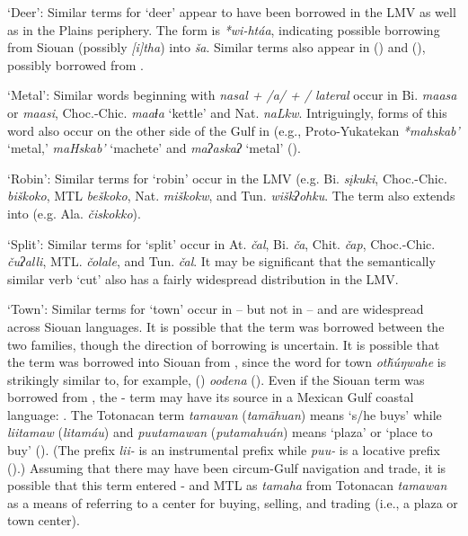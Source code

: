 \documentclass[output=paper]{LSP/langsci}
\begin{document}
\ea  \parbox[t]{.9\textwidth}{`Deer': Similar terms for `deer' appear to have been borrowed in the LMV as well as in the Plains periphery. The  form is \emph{*wi-htáa}, indicating possible borrowing from Siouan (possibly  \emph{[i]tha}) into  \emph{ša}. Similar terms also appear in  () and  (), possibly borrowed from . }
\z

\ea \parbox[t]{.9\textwidth} {`Metal': Similar words beginning with \emph{nasal + /a/ +  / lateral} occur in Bi. \emph{maasa} or \emph{maasi}, Choc.-Chic. \emph{maaɬa} `kettle' and Nat. \emph{naLkw}. Intriguingly, forms of this word also occur on the other side of the Gulf in  (e.g., Proto-Yukatekan \emph{*mahskab’} `metal,'  \emph{maHskab’} `machete' and  \emph{maʔaskaʔ} `metal' (\citealt[208]{KaufmanJusteson2003}).}
\z

\ea  \parbox[t]{.9\textwidth}{`Robin': Similar terms for `robin' occur in the LMV (e.g. Bi. \emph{sįkuki}, Choc.-Chic. \emph{biškoko}, MTL \emph{beškoko}, Nat. \emph{miškokw}, and Tun. \emph{wiškʔohku}. The term also extends into  (e.g. Ala. \emph{čiskokko}).}
\z

\ea \parbox[t]{.9\textwidth} {`Split': Similar terms for `split' occur in At. \emph{čal}, Bi. \emph{ča}, Chit. \emph{čap}, Choc.-Chic. \emph{čuʔalli}, MTL. \emph{čolale}, and Tun. \emph{čal}. It may be significant that the semantically similar verb `cut' also has a fairly widespread distribution in the LMV.}
\z

\ea  \parbox[t]{.9\textwidth}{`Town': Similar terms for `town' occur in  -- but not in  -- and are widespread across Siouan languages. It is possible that the term was borrowed between the two families, though the direction of borrowing is uncertain. It is possible that the term was borrowed into Siouan from , since the  word for town \emph{otȟúŋwahe} is strikingly similar to, for example,  () \emph{oodena} (\citealt[272]{NicholsNyholm1995}). Even if the Siouan term was borrowed from , the - term may have its source in a Mexican Gulf coastal language: . The Totonacan term \emph{tamawan} (\emph{tamāhuan}) means `s/he buys' while \emph{liitamaw} (\emph{litamáu}) and \emph{puutamawan} (\emph{putamahuán}) means `plaza' or `place to buy' (\citealt[110]{Aschmann1973}). (The  prefix \emph{lii-} is an instrumental prefix while \emph{puu-} is a locative prefix (\citealt[386,388]{MacKay1999}).) Assuming that there may have been circum-Gulf navigation and trade, it is possible that this term entered - and MTL as \emph{tamaha} from Totonacan \emph{tamawan} as a means of referring to a center for buying, selling, and trading (i.e., a plaza or town center).}
\z
\end{document}
